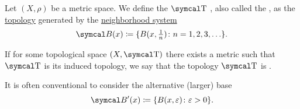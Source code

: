 \begin{Definition}\label{def:metric_topology}\cite[249]{Engelking1989}
  Let \( (X, \rho) \) be a metric space. We define the \( \CT \) , also called the , as the \hyperref[def:topological_space]{topology} generated by the \hyperref[def:topological_local_base]{neighborhood system}
  \begin{equation}\label{def:metric_topology/integer_base}
    \Cal{B}(x) \coloneqq \{ B(x, \tfrac 1 n) \colon n = 1, 2, 3, \ldots \}.
  \end{equation}

  If for some topological space \( (X, \CT) \) there exists a metric such that \( \CT \) is its induced topology, we say that the topology \( \CT \) is .

  It is often conventional to consider the alternative (larger) base
  \begin{equation}\label{def:metric_topology/real_base}
    \Cal{B}'(x) \coloneqq \{ B(x, \varepsilon) \colon \varepsilon > 0 \}.
  \end{equation}
\end{Definition}
